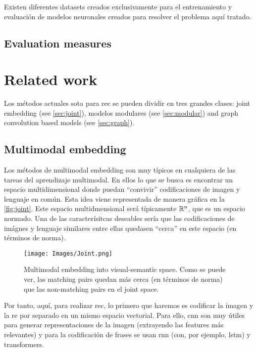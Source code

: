Existen diferentes datasets creados exclusivamente para el entrenamiento y
evaluación de modelos neuronales creados para resolver el problema aquí
tratado.


\subsection{Evaluation measures} \label{sec:eval-measure}



\section{Related work}

Los métodos actuales \gls{sota} para \gls{rec} se pueden dividir en tres
grandes clases: joint embedding (see \vref{sec:joint}), modelos modulares (see
\vref{sec:modular}) and graph convolution based models (see
\vref{sec:graph}).

\subsection{Multimodal embedding} \label{sec:joint} Los métodos de multimodal
embedding son muy típicos en cualquiera de las tareas del aprendizaje
multimodal. En ellos lo que se busca es encontrar un espacio multidimensional
donde puedan ``convivir'' codificaciones de imagen y lenguaje en común. Esta
idea viene representada de manera gráfica en la \vref{fig:joint}. Este espacio
multidmensional será típicamente \(\mathbb{R}^n\), que es un espacio normado. Una de
las caracterísitcas deseables sería que las codificaciones de imágnes y
lenguaje similares entre ellas quedasen ``cerca'' en este espacio (en términos
de norma).

\begin{figure}[ht]
  \centering
  \texttt{[image: Images/Joint.png]}
  \caption[Multimodal embedding technique]{Multimodal embedding into
    visual-semantic space. Como se puede ver, las matching pairs quedan más
    cerca (en términos de norma) que las non-matching pairs en el joint space.}
  \label{fig:joint}
\end{figure}

Por tanto, aquí, para realizar \gls{rec}, lo primero que haremos es codificar
la imagen y la \gls{re} por separado en un mismo espacio vectorial. Para ello,
\gls{cnn} son muy útiles para generar representaciones de la imagen (extrayendo
las features más relevantes) y para la codificación de frases se usan \gls{rnn}
(con, por ejemplo, \gls{lstm}) y transformers.

